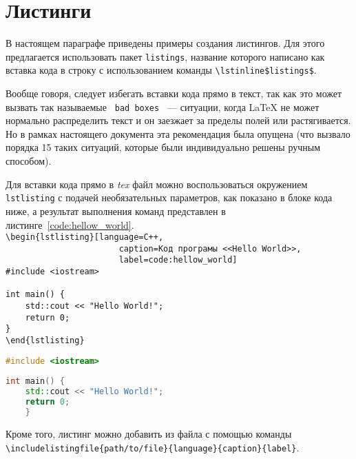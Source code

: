 \section{Листинги}

В настоящем параграфе приведены примеры создания листингов. Для этого
предлагается использовать пакет \lstinline$listings$, название которого написано
как вставка кода в строку с использованием команды
\lstinline:\lstinline$listings$:. 

Вообще говоря, следует избегать вставки кода прямо в текст, так как это может
вызвать так называемые \lstinline: bad boxes : --- ситуации, когда \LaTeX{} не
может нормально распределить текст и он заезжает за пределы полей или
растягивается. Но в рамках настоящего документа эта рекомендация была опущена
(что вызвало порядка 15 таких ситуаций, которые были индивидуально решены ручным
способом).

Для вставки кода прямо в \textit{tex} файл можно воспользоваться окружением
\lstinline:lstlisting: с подачей необязательных параметров, как показано в блоке
кода ниже, а результат выполнения команд представлен в
листинге~\ref{code:hellow_world}.\\
\lstinline$\begin{lstlisting}[language=C++,$ \\
\lstinline$                       caption=Код програмы <<Hello World>>,$ \\
\lstinline$                       label=code:hellow_world]$ \\
\lstinline$#include <iostream>$ \\
\lstinline$ $ \\
\lstinline$int main() {$ \\
\lstinline$    std::cout << "Hello World!";$ \\
\lstinline$    return 0;$ \\
\lstinline$}$ \\
\lstinline$\end{lstlisting}$

\begin{lstlisting}[language=C++,caption=Код програмы <<Hello World>>,label=code:hellow_world]
#include <iostream>
	
int main() {
	std::cout << "Hello World!";
	return 0;
	}
\end{lstlisting}

Кроме того, листинг можно добавить из файла с помощью команды
\lstinline:\includelistingfile{path/to/file}{language}{caption}{label}:. 

